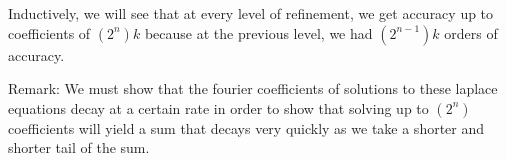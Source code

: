 \documentclass[12pt]{article}
\begin{document}
    Inductively, we will see that at every level of refinement, we get accuracy up to coefficients of $(2^n) k$ because at the previous level, we had $(2^{n-1}) k$ orders of accuracy.
    
    Remark: We must show that the fourier coefficients of solutions to these laplace equations decay at a certain rate in order to show that solving up to $(2^{n})$ coefficients will yield a sum that decays very quickly as we take a shorter and shorter tail of the sum. 
    
    
    
    
    
    
    
    





{\footnotesize



}
\end{document}
